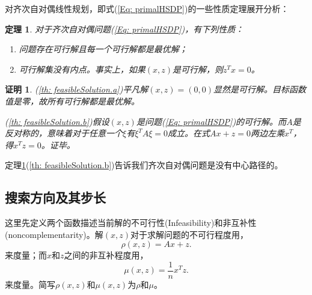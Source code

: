 \documentclass{ctexart}
\numberwithin{equation}{section} %
\newtheorem{theorem}{定理}[section]
\newtheorem*{Proof}{证明}
\begin{document}
对齐次自对偶线性规划，即式(\ref{Eq: primalHSDP})的一些性质定理展开分析：
\begin{theorem}
	\label{th: feasibleSolution}
	对于齐次自对偶问题(\ref{Eq: primalHSDP})，有下列性质：
	\begin{enumerate}[(1)]
		\item \label{th: feasibleSolution.a} 问题存在可行解且每一个可行解都是最优解；\\
		\item \label{th: feasibleSolution.b} 可行解集没有内点。事实上，如果$ \left(x, z\right) $是可行解，则$ z^{T}x = 0 $。
	\end{enumerate}
\end{theorem}
\begin{Proof}
	(\ref{th: feasibleSolution.a})平凡解$ \left(x, z\right)  = \left(0, 0\right)$显然是可行解。目标函数值是零，故所有可行解都是最优解。
	
	(\ref{th: feasibleSolution.b})假设$ \left(x, z\right) $是问题(\ref{Eq: primalHSDP})的可行解。而$ A $是反对称的，意味着对于任意一个$ \xi $有$ {\xi}^{T}A\xi = 0 $成立。在式$ Ax + z = 0 $两边左乘$ x^{T} $，得$ x^Tz = 0 $。证毕。
\end{Proof}

定理\ref{th: feasibleSolution}(\ref{th: feasibleSolution.b})告诉我们齐次自对偶问题是没有中心路径的。

\subsection{搜索方向及其步长}

这里先定义两个函数描述当前解的不可行性(Infeasibility)和非互补性(noncomplementarity)。解$ \left(x, z\right) $对于求解问题的不可行程度用，
\begin{equation}
	\rho\left(x, z\right) = Ax + z. \nonumber
\end{equation}
来度量；而$ x $和$ z $之间的非互补程度用，
\begin{equation}
	\mu\left(x, z\right) = \frac{1}{n}x^{T}z. \nonumber
\end{equation}
来度量。简写$ \rho\left(x, z\right)  $和$ \mu\left(x, z\right) $为$ \rho $和$ \mu $。
\end{document}
